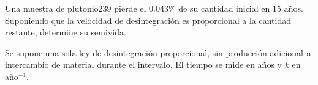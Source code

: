 Una muestra de plutonio239 pierde el $0.043\%$ de su cantidad inicial en $15$ años. Suponiendo que la velocidad de desintegración es proporcional a la cantidad restante, determine su semivida.

Se supone una sola ley de desintegración proporcional, sin producción adicional ni intercambio de material durante el intervalo. El tiempo se mide en años y $k$ en año$^{-1}$.
